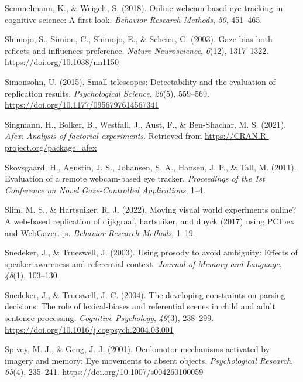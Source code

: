 \documentclass[
  man,floatsintext]{apa6}
\newlength{\cslhangindent}
\newenvironment{CSLReferences}[2] %
 {\begin{list}{}{%
  \setlength{\itemindent}{0pt}
  \setlength{\leftmargin}{0pt}
  \setlength{\parsep}{0pt}
  \ifodd #1
   \setlength{\leftmargin}{\cslhangindent}
   \setlength{\itemindent}{-1\cslhangindent}
  \fi
  \setlength{\itemsep}{#2\baselineskip}}}
 {\end{list}}
\begin{document}
\begin{CSLReferences}{1}{0}
Semmelmann, K., \& Weigelt, S. (2018). Online webcam-based eye tracking in cognitive science: A first look. \emph{Behavior Research Methods}, \emph{50}, 451--465.

Shimojo, S., Simion, C., Shimojo, E., \& Scheier, C. (2003). Gaze bias both reflects and influences preference. \emph{Nature Neuroscience}, \emph{6}(12), 1317--1322. \url{https://doi.org/10.1038/nn1150}

Simonsohn, U. (2015). Small telescopes: Detectability and the evaluation of replication results. \emph{Psychological Science}, \emph{26}(5), 559--569. \url{https://doi.org/10.1177/0956797614567341}

Singmann, H., Bolker, B., Westfall, J., Aust, F., \& Ben-Shachar, M. S. (2021). \emph{Afex: Analysis of factorial experiments}. Retrieved from \url{https://CRAN.R-project.org/package=afex}

Skovsgaard, H., Agustin, J. S., Johansen, S. A., Hansen, J. P., \& Tall, M. (2011). Evaluation of a remote webcam-based eye tracker. \emph{Proceedings of the 1st Conference on Novel Gaze-Controlled Applications}, 1--4.

Slim, M. S., \& Hartsuiker, R. J. (2022). Moving visual world experiments online? A web-based replication of dijkgraaf, hartsuiker, and duyck (2017) using PCIbex and WebGazer. js. \emph{Behavior Research Methods}, 1--19.

Snedeker, J., \& Trueswell, J. (2003). Using prosody to avoid ambiguity: Effects of speaker awareness and referential context. \emph{Journal of Memory and Language}, \emph{48}(1), 103--130.

Snedeker, J., \& Trueswell, J. C. (2004). The developing constraints on parsing decisions: {The} role of lexical-biases and referential scenes in child and adult sentence processing. \emph{Cognitive Psychology}, \emph{49}(3), 238--299. \url{https://doi.org/10.1016/j.cogpsych.2004.03.001}

Spivey, M. J., \& Geng, J. J. (2001). Oculomotor mechanisms activated by imagery and memory: Eye movements to absent objects. \emph{Psychological Research}, \emph{65}(4), 235--241. \url{https://doi.org/10.1007/s004260100059}


\end{CSLReferences}
\end{document}
